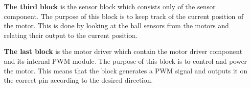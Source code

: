 \textbf{The third block} is the sensor block which consists only of the sensor component. The purpose of this block is to keep track of the current position of the motor. This is done by looking at the hall sensors from the motors and relating their output to the current position.

\textbf{The last block} is the motor driver which contain the motor driver component and its internal PWM module. The purpose of this block is to control and power the motor. This means that the block generates a PWM signal and outputs it on the correct pin according to the desired direction.








































